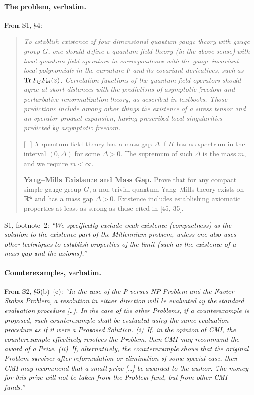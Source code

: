 \documentclass[11pt,a4paper]{article}
\begin{document}
\paragraph{The problem, verbatim.} From S1, \S4:
\begin{quote}\itshape
To establish existence of four-dimensional quantum gauge theory with gauge group $G$, one should define a quantum field theory (in the above sense) with local quantum field operators in correspondence with the gauge-invariant local polynomials in the curvature $F$ and its covariant derivatives, such as $\operatorname{Tr} F_{ij}F_{kl}(x)$. Correlation functions of the quantum field operators should agree at short distances with the predictions of asymptotic freedom and perturbative renormalization theory, as described in textbooks. Those predictions include among other things the existence of a stress tensor and an operator product expansion, having prescribed local singularities predicted by asymptotic freedom.

[\dots] A quantum field theory has a mass gap $\Delta$ if $H$ has no spectrum in the interval $(0,\Delta)$ for some $\Delta>0$. The supremum of such $\Delta$ is the mass $m$, and we require $m<\infty$.

\textbf{Yang--Mills Existence and Mass Gap.} Prove that for any compact simple gauge group $G$, a non-trivial quantum Yang--Mills theory exists on $\mathbb R^4$ and has a mass gap $\Delta>0$. Existence includes establishing axiomatic properties at least as strong as those cited in [45, 35].
\end{quote}
S1, footnote~2: \emph{\enquote{We specifically exclude weak-existence (compactness) as the solution to the existence part of the Millennium problem, unless one also uses other techniques to establish properties of the limit (such as the existence of a mass gap and the axioms).}}

\paragraph{Counterexamples, verbatim.} From S2, \S5(b)--(c): \emph{\enquote{In the case of the P versus NP Problem and the Navier-Stokes Problem, a resolution in either direction will be evaluated by the standard evaluation procedure [\dots]. In the case of the other Problems, if a counterexample is proposed, such counterexample shall be evaluated using the same evaluation procedure as if it were a Proposed Solution. (i)~If, in the opinion of CMI, the counterexample effectively resolves the Problem, then CMI may recommend the award of a Prize. (ii)~If, alternatively, the counterexample shows that the original Problem survives after reformulation or elimination of some special case, then CMI may recommend that a small prize [\dots] be awarded to the author. The money for this prize will not be taken from the Problem fund, but from other CMI funds.}}
\end{document}
